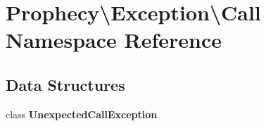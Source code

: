\section{Prophecy\textbackslash{}Exception\textbackslash{}Call Namespace Reference}
\label{namespace_prophecy_1_1_exception_1_1_call}
\subsection*{Data Structures}
\begin{DoxyCompactItemize}
\item 
class {\bf Unexpected\+Call\+Exception}
\end{DoxyCompactItemize}
